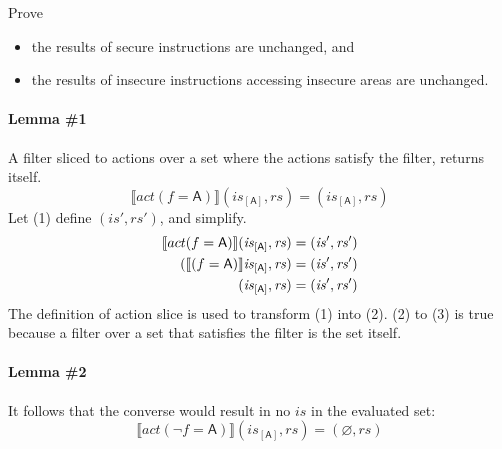\documentclass[12pt, letterpaper]{article}
\let\emptyset\varnothing
\begin{document}
 Prove
 \begin{itemize}
     \item the results of secure instructions are unchanged, and
     \item the results of insecure instructions accessing insecure areas are unchanged.
 \end{itemize}

 \paragraph{Lemma \#1}
     A filter sliced to actions over a set where the actions satisfy the filter, returns itself.
 \[
     \llbracket act(f=\mathsf{A}) \rrbracket (\mathit{is}_{[\mathsf{A}]}, \mathit{rs}) = (\mathit{is_{[\mathsf{A}]}}, \mathit{rs})
 \]
     Let (1) define $(\mathit{is}', \mathit{rs}')$, and simplify.
 \begin{align}
     \setcounter{equation}{0}
     \llbracket act(f=\mathsf{A}) \rrbracket (\mathit{is}_{[\mathsf{A}]}, \mathit{rs})
     &= 
     (\mathit{is}', \mathit{rs}')
     \\
     (\llbracket (f=\mathsf{A}) \rrbracket \mathit{is}_{[\mathsf{A}]}, \mathit{rs})
     &= 
     (\mathit{is}', \mathit{rs}')
     \\
     (\mathit{is}_{[\mathsf{A}]}, \mathit{rs})
     &= 
     (\mathit{is}', \mathit{rs}')
 \end{align}
     The definition of action slice is used to transform (1) into (2).  (2) to (3) is true because a filter over a set that satisfies the filter is the set itself.\\
 \paragraph{Lemma \#2}
     It follows that the converse would result in no $\mathit{is}$ in the evaluated set:
 \[
     \llbracket act(\neg f=\mathsf{A}) \rrbracket (\mathit{is}_{[\mathsf{A}]}, \mathit{rs}) = (\emptyset, \mathit{rs})
 \]
\end{document}
